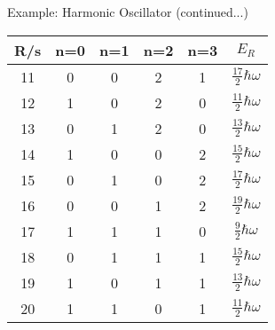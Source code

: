 \documentclass{beamer}
\begin{document}
\begin{frame}{Example: Harmonic Oscillator}
	(continued...)\\
	\centering
	\renewcommand{\arraystretch}{1.5}
	\begin{tabular}{|c|c|c|c|c|c|}
		\hline
		R/s&n=0&n=1&n=2&n=3&$E_R$\\
		\hline
		11&0&0&2&1&$\frac{17}{2}\hbar\omega$\\
		\hline
		12&1&0&2&0&$\frac{11}{2}\hbar\omega$\\
		\hline
		13&0&1&2&0&$\frac{13}{2}\hbar\omega$\\
		\hline
		14&1&0&0&2&$\frac{15}{2}\hbar\omega$\\
		\hline
		15&0&1&0&2&$\frac{17}{2}\hbar\omega$\\
		\hline
		16&0&0&1&2&$\frac{19}{2}\hbar\omega$\\
		\hline
		17&1&1&1&0&$\frac{9}{2}\hbar\omega$\\
		\hline
		18&0&1&1&1&$\frac{15}{2}\hbar\omega$\\
		\hline
		19&1&0&1&1&$\frac{13}{2}\hbar\omega$\\
		\hline
		20&1&1&0&1&$\frac{11}{2}\hbar\omega$\\
		\hline
	\end{tabular}
\end{frame}
\end{document}
